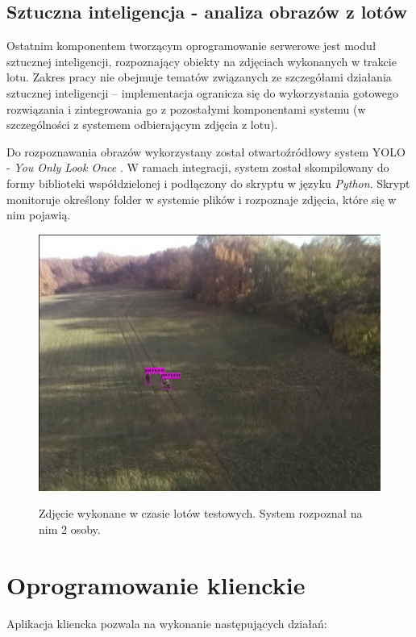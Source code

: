 \subsection{Sztuczna inteligencja - analiza obrazów z lotów}

Ostatnim komponentem tworzącym oprogramowanie serwerowe jest moduł sztucznej inteligencji,
rozpoznający obiekty na zdjęciach wykonanych w trakcie lotu. Zakres pracy nie obejmuje
tematów związanych ze szczegółami działania sztucznej inteligencji -- implementacja
ogranicza się do wykorzystania gotowego rozwiązania i zintegrowania
go z pozostałymi komponentami systemu (w szczególności z systemem
odbierającym zdjęcia z lotu).

Do rozpoznawania obrazów wykorzystany został otwartoźródłowy system
YOLO - \textit{You Only Look Once} \cite{yolo}. W ramach integracji, system został
skompilowany do formy biblioteki współdzielonej i podłączony do skryptu
w języku \textit{Python}. Skrypt monitoruje określony folder w systemie plików
i rozpoznaje zdjęcia, które się w nim pojawią.


\begin{figure}[H]
	\centering
	\caption{ Zdjęcie wykonane w czasie lotów testowych. System rozpoznał na nim 2 osoby.}
\includegraphics[width=.7\linewidth]{rys03/rozpoznane_yolo.jpg}
	\label{yolo_example}
\end{figure}

\section{Oprogramowanie klienckie}

Aplikacja kliencka pozwala na wykonanie następujących działań:

